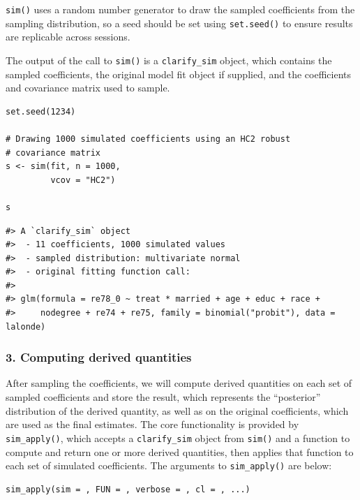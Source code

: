 \texttt{sim()} uses a random number generator to draw the sampled coefficients from the sampling distribution, so a seed should be set using \texttt{set.seed()} to ensure results are replicable across sessions.

The output of the call to \texttt{sim()} is a \texttt{clarify\_sim} object, which contains the sampled coefficients, the original model fit object if supplied, and the coefficients and covariance matrix used to sample.

\begin{verbatim}
set.seed(1234)

# Drawing 1000 simulated coefficients using an HC2 robust
# covariance matrix
s <- sim(fit, n = 1000,
         vcov = "HC2")

s
\end{verbatim}

\begin{verbatim}
#> A `clarify_sim` object
#>  - 11 coefficients, 1000 simulated values
#>  - sampled distribution: multivariate normal
#>  - original fitting function call:
#> 
#> glm(formula = re78_0 ~ treat * married + age + educ + race + 
#>     nodegree + re74 + re75, family = binomial("probit"), data = lalonde)
\end{verbatim}

\hypertarget{computing-derived-quantities}{%
\subsubsection{3. Computing derived quantities}\label{computing-derived-quantities}}

After sampling the coefficients, we will compute derived quantities on each set of sampled coefficients and store the result, which represents the ``posterior'' distribution of the derived quantity, as well as on the original coefficients, which are used as the final estimates. The core functionality is provided by \texttt{sim\_apply()}, which accepts a \texttt{clarify\_sim} object from \texttt{sim()} and a function to compute and return one or more derived quantities, then applies that function to each set of simulated coefficients. The arguments to \texttt{sim\_apply()} are below:

\begin{verbatim}
sim_apply(sim = , FUN = , verbose = , cl = , ...)
\end{verbatim}

